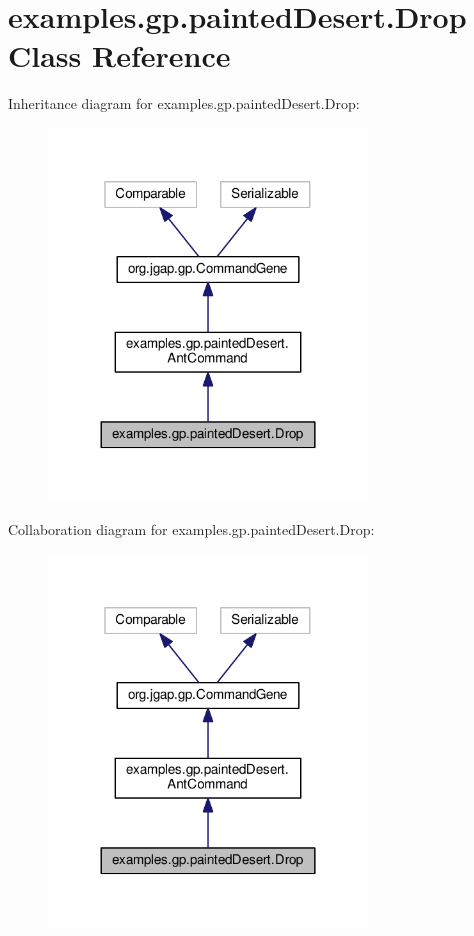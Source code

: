 \hypertarget{classexamples_1_1gp_1_1painted_desert_1_1_drop}{\section{examples.\-gp.\-painted\-Desert.\-Drop Class Reference}
\label{classexamples_1_1gp_1_1painted_desert_1_1_drop}
}


Inheritance diagram for examples.\-gp.\-painted\-Desert.\-Drop\-:
\nopagebreak
\begin{figure}[H]
\begin{center}
\leavevmode
\includegraphics[width=240pt]{classexamples_1_1gp_1_1painted_desert_1_1_drop__inherit__graph}
\end{center}
\end{figure}


Collaboration diagram for examples.\-gp.\-painted\-Desert.\-Drop\-:
\nopagebreak
\begin{figure}[H]
\begin{center}
\leavevmode
\includegraphics[width=240pt]{classexamples_1_1gp_1_1painted_desert_1_1_drop__coll__graph}
\end{center}
\end{figure}
